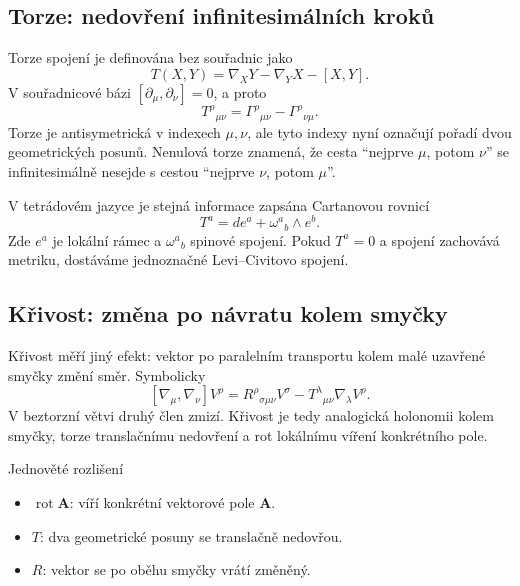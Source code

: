 \subsection{Torze: nedovření infinitesimálních kroků}
Torze spojení je definována bez souřadnic jako
\[
  T(X,Y)=\nabla_XY-\nabla_YX-[X,Y].
\]
V souřadnicové bázi $[\partial_\mu,\partial_\nu]=0$, a proto
\[
  \boxed{
  T^\rho{}_{\mu\nu}
  =\Gamma^\rho{}_{\mu\nu}-\Gamma^\rho{}_{\nu\mu}.}
\]
Torze je antisymetrická v indexech $\mu,\nu$, ale tyto indexy nyní označují
pořadí dvou geometrických posunů. Nenulová torze znamená, že cesta ``nejprve
$\mu$, potom $\nu$'' se infinitesimálně nesejde s cestou ``nejprve $\nu$,
potom $\mu$''.

\begin{center}
\end{center}

V tetrádovém jazyce je stejná informace zapsána Cartanovou rovnicí
\[
  \boxed{T^a=de^a+\omega^a{}_b\wedge e^b.}
\]
Zde $e^a$ je lokální rámec a $\omega^a{}_b$ spinové spojení. Pokud $T^a=0$ a
spojení zachovává metriku, dostáváme jednoznačné Levi--Civitovo spojení.

\subsection{Křivost: změna po návratu kolem smyčky}
Křivost měří jiný efekt: vektor po paralelním transportu kolem malé uzavřené
smyčky změní směr. Symbolicky
\[
  [\nabla_\mu,\nabla_\nu]V^\rho
  =R^\rho{}_{\sigma\mu\nu}V^\sigma
   -T^\lambda{}_{\mu\nu}\nabla_\lambda V^\rho.
\]
V beztorzní větvi druhý člen zmizí. Křivost je tedy analogická holonomii kolem
smyčky, torze translačnímu nedovření a rot lokálnímu víření konkrétního pole.

\begin{memorybox}{Jednověté rozlišení}
\begin{itemize}[leftmargin=*,itemsep=0.2em]
  \item $\operatorname{rot}\mathbf A$: víří konkrétní vektorové pole $\mathbf A$.
  \item $T$: dva geometrické posuny se translačně nedovřou.
  \item $R$: vektor se po oběhu smyčky vrátí změněný.
\end{itemize}
\end{memorybox}

